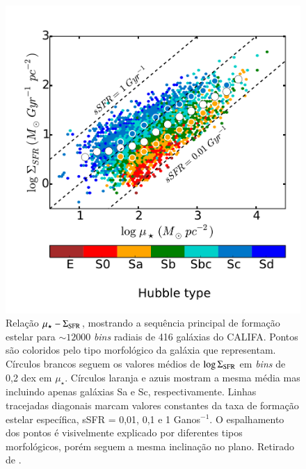 \begin{figure}
  \includegraphics[scale=0.65]{figuras/Fig_MSSF_local_Vmax_Bgsd6e.pdf}
  \caption[$\log \Sigma_{SFR}\ \times\ \log \mu_\star$]
{Relação $\mu_\star-\Sigma_{\rm SFR}$, mostrando a sequência principal de formação estelar para $\sim 12000$ {\em bins} radiais de 416 galáxias do CALIFA. Pontos são coloridos pelo tipo morfológico da galáxia que representam. Círculos brancos seguem os valores médios de $\log \Sigma_{\rm SFR}$ em {\em bins} de 0,2 dex em $\mu_\star$. Círculos laranja e azuis mostram a mesma média mas incluindo apenas galáxias Sa e Sc, respectivamente. Linhas tracejadas diagonais marcam valores constantes da taxa de formação estelar específica, sSFR = 0,01, 0,1 e 1 Ganos$^{-1}$. O espalhamento dos pontos é visivelmente explicado por diferentes tipos morfológicos, porém seguem a mesma inclinação no plano.  Retirado de \citet{GonzalezDelgado.etal.2016a}.}
  \label{fig:SFRSD_McorSD_bins}
\end{figure}

